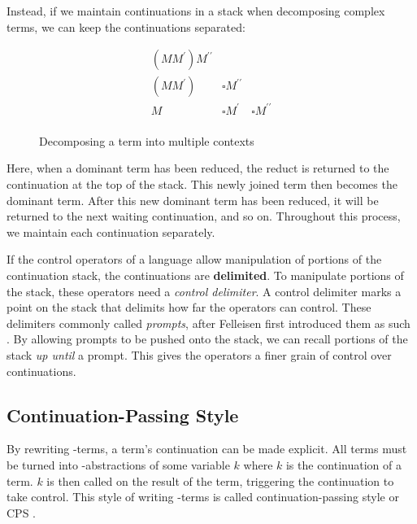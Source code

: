   Instead, if we maintain continuations in a stack when decomposing complex terms, 
  we can keep the continuations separated:
  
  \begin{figure}[H]
    \[
    \begin{array}{lll}
      (MM^\prime) M^{\prime\prime} \\
      (MM^\prime) & \square M^{\prime\prime} \\
      M & \square M^\prime & \square M^{\prime\prime} \\
    \end{array}
    \]
  \caption{Decomposing a term into multiple contexts}
  \end{figure}

  Here, when a dominant term has been reduced, 
  the reduct is returned to the continuation at the top of the stack. 
  This newly joined term then becomes the dominant term. 
  After this new dominant term has been reduced, 
  it will be returned to the next waiting continuation, and so on. 
  Throughout this process, we maintain each continuation separately.

  If the control operators of a language allow manipulation of portions of the continuation stack,
  the continuations are \textbf{delimited}.
  To manipulate portions of the stack, these operators need a \emph{control delimiter}.
  A control delimiter marks a point on the stack that delimits how far the operators can control.
  These delimiters commonly called \emph{prompts}, after Felleisen first introduced them as such \cite{Felleisen88}.
  By allowing prompts to be pushed onto the stack, we can recall portions of the stack \emph{up until} a prompt.
  This gives the operators a finer grain of control over continuations.

  \subsection{Continuation-Passing Style}
 
  By rewriting \lam-terms, a term's continuation can be made explicit. 
  All terms must be turned into \lam-abstractions of some variable $k$ where $k$ is the continuation of a term. 
  $k$ is then called on the result of the term, triggering the continuation to take control.
  This style of writing \lam-terms is called continuation-passing style or CPS \cite{Sussman98}.
  
  
